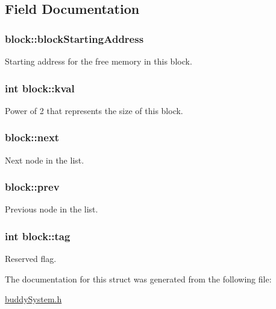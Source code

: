 \subsection{Field Documentation}
\hypertarget{structblock_afd27ab0eef51c6215d80a88e6d8780fb}{
\subsubsection[{blockStartingAddress}]{ {\bf block::blockStartingAddress}}}
\label{structblock_afd27ab0eef51c6215d80a88e6d8780fb}


Starting address for the free memory in this block. 

\hypertarget{structblock_a777d6e8dc19e0d7e22a427beddc1bf33}{
\subsubsection[{kval}]{\setlength{\rightskip}{0pt plus 5cm}int {\bf block::kval}}}
\label{structblock_a777d6e8dc19e0d7e22a427beddc1bf33}


Power of 2 that represents the size of this block. 

\hypertarget{structblock_ad58cc5ebb0e89cbc0d9ebe30e5c6486f}{
\subsubsection[{next}]{ {\bf block::next}}}
\label{structblock_ad58cc5ebb0e89cbc0d9ebe30e5c6486f}


Next node in the list. 

\hypertarget{structblock_a70aa184bc80f3228d4ee797bbb07359a}{
\subsubsection[{prev}]{ {\bf block::prev}}}
\label{structblock_a70aa184bc80f3228d4ee797bbb07359a}


Previous node in the list. 

\hypertarget{structblock_a1fb02e310e6b4ef6f7a273c68d77f2c5}{
\subsubsection[{tag}]{\setlength{\rightskip}{0pt plus 5cm}int {\bf block::tag}}}
\label{structblock_a1fb02e310e6b4ef6f7a273c68d77f2c5}


Reserved flag. 



The documentation for this struct was generated from the following file:\begin{DoxyCompactItemize}
\item 
\hyperlink{buddySystem_8h}{buddySystem.h}\end{DoxyCompactItemize}
